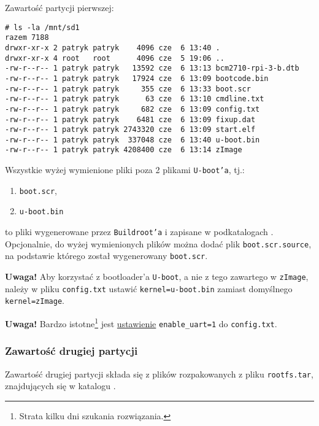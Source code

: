 \documentclass{article}
\begin{document}
Zawartość partycji pierwszej:
\begin{lstlisting}[basicstyle=\ttfamily,breaklines=true]
# ls -la /mnt/sd1
razem 7188
drwxr-xr-x 2 patryk patryk    4096 cze  6 13:40 .
drwxr-xr-x 4 root   root      4096 cze  5 19:06 ..
-rw-r--r-- 1 patryk patryk   13592 cze  6 13:13 bcm2710-rpi-3-b.dtb
-rw-r--r-- 1 patryk patryk   17924 cze  6 13:09 bootcode.bin
-rw-r--r-- 1 patryk patryk     355 cze  6 13:33 boot.scr
-rw-r--r-- 1 patryk patryk      63 cze  6 13:10 cmdline.txt
-rw-r--r-- 1 patryk patryk     682 cze  6 13:09 config.txt
-rw-r--r-- 1 patryk patryk    6481 cze  6 13:09 fixup.dat
-rw-r--r-- 1 patryk patryk 2743320 cze  6 13:09 start.elf
-rw-r--r-- 1 patryk patryk  337048 cze  6 13:40 u-boot.bin
-rw-r--r-- 1 patryk patryk 4208400 cze  6 13:14 zImage
\end{lstlisting}
Wszystkie wyżej wymienione pliki poza 2 plikami \texttt{U-boot'a}, tj.:
\begin{enumerate}
	\item \texttt{boot.scr},
	\item \texttt{u-boot.bin}
\end{enumerate}
to pliki wygenerowane przez \texttt{Buildroot'a} i zapisane w podkatalogach . Opcjonalnie, do wyżej wymienionych plików można dodać plik \texttt{boot.scr.source}, na podstawie którego został wygenerowany \texttt{boot.scr}.

\textbf{Uwaga!} Aby korzystać z bootloader'a \texttt{U-boot}, a nie z tego zawartego w \texttt{zImage}, należy w pliku \texttt{config.txt} ustawić \texttt{kernel=u-boot.bin} zamiast domyślnego \texttt{kernel=zImage}.

\textbf{Uwaga!} Bardzo istotne\footnote{Strata kilku dni szukania rozwiązania.} jest \href{https://www.raspberrypi.org/forums/viewtopic.php?f=28&t=141195}{ustawienie} \texttt{enable\_uart=1} do \texttt{config.txt}.


\subsubsection{Zawartość drugiej partycji}

Zawartość drugiej partycji składa się z plików rozpakowanych z pliku \texttt{rootfs.tar}, znajdujących się w katalogu .

\end{document}
